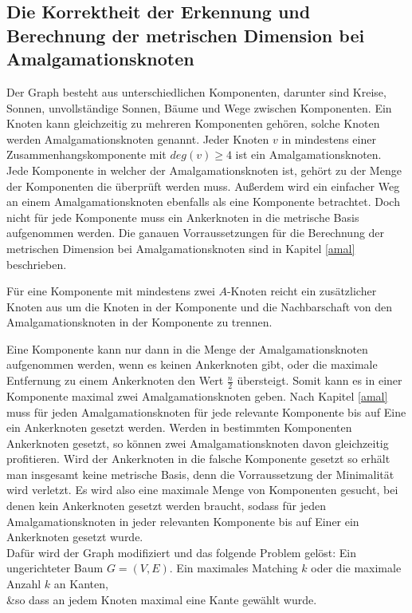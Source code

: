 \subsection{Die Korrektheit der Erkennung und Berechnung der metrischen Dimension bei Amalgamationsknoten}
\label{korramal}
Der Graph besteht aus unterschiedlichen Komponenten, darunter sind Kreise, Sonnen, unvollständige Sonnen, Bäume und Wege zwischen Komponenten. Ein Knoten kann gleichzeitig zu mehreren Komponenten gehören, solche Knoten werden Amalgamationsknoten genannt.\newline 
Jeder Knoten $v$ in mindestens einer Zusammenhangskomponente mit $deg(v)\geq 4$ ist ein Amalgamationsknoten.\\
Jede Komponente in welcher der Amalgamationsknoten ist, gehört zu der Menge der Komponenten die überprüft werden muss. Außerdem wird ein einfacher Weg an einem Amalgamationsknoten ebenfalls als eine Komponente betrachtet. Doch nicht für jede Komponente muss ein Ankerknoten in die metrische Basis aufgenommen werden.
Die ganauen Vorraussetzungen für die Berechnung der metrischen Dimension bei Amalgamationsknoten sind in Kapitel \ref{amal} beschrieben.
\begin{lem}
Für eine Komponente mit mindestens zwei $A$-Knoten reicht ein zusätzlicher Knoten aus um die Knoten in der Komponente und die Nachbarschaft von den Amalgamationsknoten in der Komponente zu trennen.
\end{lem}
Eine Komponente kann nur dann in die Menge der Amalgamationsknoten aufgenommen werden, wenn es keinen Ankerknoten gibt, oder die maximale Entfernung zu einem Ankerknoten den Wert $\frac{n}{2}$ übersteigt. Somit kann es in einer Komponente maximal zwei Amalgamationsknoten geben.
Nach Kapitel \ref{amal} muss für jeden Amalgamationsknoten für jede relevante Komponente bis auf Eine ein Ankerknoten gesetzt werden. Werden in bestimmten Komponenten Ankerknoten gesetzt, so können zwei Amalgamationsknoten davon gleichzeitig profitieren. Wird der Ankerknoten in die falsche Komponente gesetzt so erhält man insgesamt keine metrische Basis, denn die Vorraussetzung der Minimalität wird verletzt. Es wird also eine maximale Menge von Komponenten gesucht, bei denen kein Ankerknoten gesetzt werden braucht, sodass für jeden Amalgamationsknoten in jeder relevanten Komponente bis auf Einer ein Ankerknoten gesetzt wurde.\\
Dafür wird der Graph modifiziert und das folgende Problem gelöst:
\vspace{-1mm}
{Ein ungerichteter Baum $G=(V,E)$.}
{Ein maximales Matching $k$ oder die maximale Anzahl $k$ an Kanten,\\&so dass an jedem Knoten maximal eine Kante gewählt wurde.}


